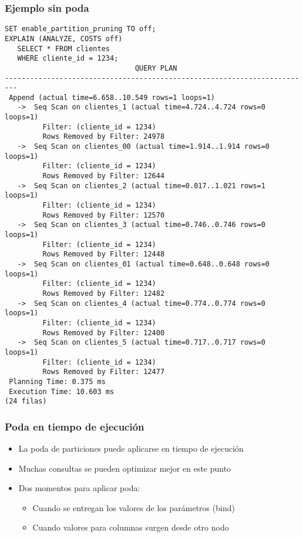 \begin{frame}[fragile]
  \frametitle{Ejemplo sin poda}
\footnotesize
\begin{lstlisting}
SET enable_partition_pruning TO off;
EXPLAIN (ANALYZE, COSTS off)
   SELECT * FROM clientes
   WHERE cliente_id = 1234;
                               QUERY PLAN                                
-------------------------------------------------------------------------
 Append (actual time=6.658..10.549 rows=1 loops=1)
   ->  Seq Scan on clientes_1 (actual time=4.724..4.724 rows=0 loops=1)
         Filter: (cliente_id = 1234)
         Rows Removed by Filter: 24978
   ->  Seq Scan on clientes_00 (actual time=1.914..1.914 rows=0 loops=1)
         Filter: (cliente_id = 1234)
         Rows Removed by Filter: 12644
   ->  Seq Scan on clientes_2 (actual time=0.017..1.021 rows=1 loops=1)
         Filter: (cliente_id = 1234)
         Rows Removed by Filter: 12570
   ->  Seq Scan on clientes_3 (actual time=0.746..0.746 rows=0 loops=1)
         Filter: (cliente_id = 1234)
         Rows Removed by Filter: 12448
   ->  Seq Scan on clientes_01 (actual time=0.648..0.648 rows=0 loops=1)
         Filter: (cliente_id = 1234)
         Rows Removed by Filter: 12482
   ->  Seq Scan on clientes_4 (actual time=0.774..0.774 rows=0 loops=1)
         Filter: (cliente_id = 1234)
         Rows Removed by Filter: 12400
   ->  Seq Scan on clientes_5 (actual time=0.717..0.717 rows=0 loops=1)
         Filter: (cliente_id = 1234)
         Rows Removed by Filter: 12477
 Planning Time: 0.375 ms
 Execution Time: 10.603 ms
(24 filas)

\end{lstlisting}
\end{frame}

\begin{frame}
  \frametitle{Poda en tiempo de ejecución}

  \begin{itemize}
    \item La poda de particiones puede aplicarse en tiempo de ejecución
    \item Muchas consultas se pueden optimizar mejor en este punto
    \item Dos momentos para aplicar poda:
      \begin{itemize}
	\item Cuando se entregan los valores de los parámetros (bind)
	\item Cuando valores para columnas surgen desde otro nodo
      \end{itemize}
  \end{itemize}
\end{frame}

